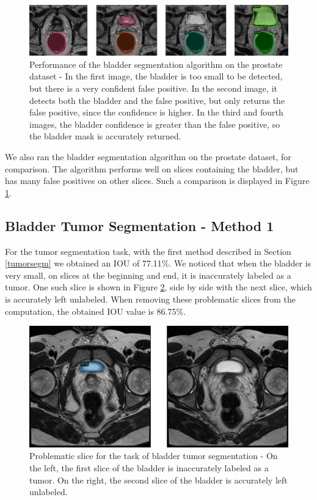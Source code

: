 \documentclass[runningheads,a4paper,11pt]{report}
\begin{document}
\begin{figure}[htbp]
	\centerline{\includegraphics[width=17cm]{images/bladder_4.png}}
	\caption{Performance of the bladder segmentation algorithm on the prostate dataset - In the first image, the bladder is too small to be detected, but there is a very confident false positive. In the second image, it detects both the bladder and the false positive, but only returns the false positive, since the confidence is higher. In the third and fourth images, the bladder confidence is greater than the false positive, so the bladder mask is accurately returned.}
	\label{bladder_4}
\end{figure}

We also ran the bladder segmentation algorithm on the prostate dataset, for comparison. The algorithm performs well on slices containing the bladder, but has many false positives on other slices. Such a comparison is displayed in Figure \ref{bladder_4}.

\subsection{Bladder Tumor Segmentation - Method 1}\label{method1}

For the tumor segmentation task, with the first method described in Section \ref{tumorsegm} we obtained an IOU of 77.11\%. We noticed that when the bladder is very small, on slices at the beginning and end, it is inaccurately labeled as a tumor. One such slice is shown in Figure \ref{bladder_5}, side by side with the next slice, which is accurately left unlabeled. When removing these problematic slices from the computation, the obtained IOU value is 86.75\%.

\begin{figure}[htbp]
	\centerline{\includegraphics[width=17cm]{images/bladder_5.png}}
	\caption{Problematic slice for the task of bladder tumor segmentation - On the left, the first slice of the bladder is inaccurately labeled as a tumor. On the right, the second slice of the bladder is accurately left unlabeled.}
	\label{bladder_5}
\end{figure}
\end{document}
